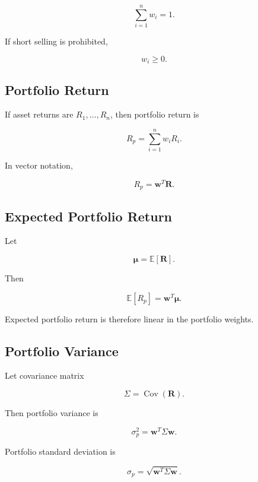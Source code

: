 \[
\boxed{
\sum_{i=1}^{n}w_i=1.
}
\]

If short selling is prohibited,

\[
\boxed{
w_i\geq0.
}
\]

\subsection{Portfolio Return}
\label{subsec:portfolio-return}

If asset returns are \(R_1,\ldots,R_n\), then portfolio return is

\[
\boxed{
R_p
=
\sum_{i=1}^{n}
w_iR_i.
}
\]

In vector notation,

\[
\boxed{
R_p
=
\mathbf{w}^T\mathbf{R}.
}
\]

\subsection{Expected Portfolio Return}
\label{subsec:expected-portfolio-return}

Let

\[
\boldsymbol{\mu}
=
\mathbb{E}[\mathbf{R}].
\]

Then

\[
\boxed{
\mathbb{E}[R_p]
=
\mathbf{w}^T\boldsymbol{\mu}.
}
\]

Expected portfolio return is therefore linear in the portfolio weights.

\subsection{Portfolio Variance}
\label{subsec:portfolio-variance}

Let covariance matrix

\[
\boxed{
\Sigma
=
\operatorname{Cov}(\mathbf{R}).
}
\]

Then portfolio variance is

\[
\boxed{
\sigma_p^2
=
\mathbf{w}^T
\Sigma
\mathbf{w}.
}
\]

Portfolio standard deviation is

\[
\boxed{
\sigma_p
=
\sqrt{
\mathbf{w}^T\Sigma\mathbf{w}
}.
}
\]

